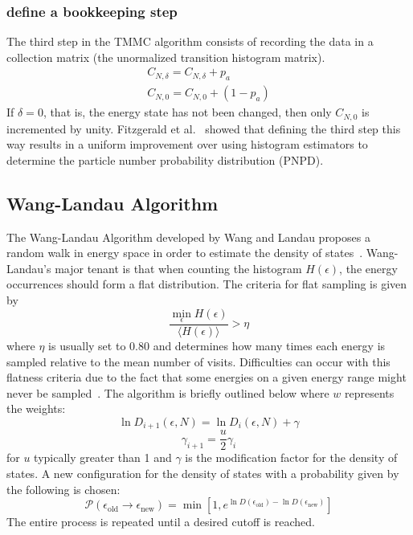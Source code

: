 \documentclass[letterpaper,twocolumn,amsmath,amssymb,pre,aps,10pt]{revtex4-1}
\begin{document}
\subsubsection{define a bookkeeping step}
The third step in the TMMC algorithm consists of recording the data in
a collection matrix (the unormalized transition histogram matrix).
\begin{align}
  C_{N,\delta} = C_{N,\delta} + p_{a}\\
  C_{N,0} = C_{N,0} +(1 - p_{a})
\end{align} If $\delta=0$, that is, the energy state has not been
changed, then only $C_{N,0}$ is incremented by unity. Fitzgerald et
al.~\cite{fitzgerald2000monte} showed that defining the third step this
way results in a uniform improvement over using histogram estimators to
determine the particle number probability distribution (PNPD).

\subsection{Wang-Landau Algorithm}

The Wang-Landau Algorithm developed by Wang and Landau proposes a
random walk in energy space in order to estimate the density of
states~\cite{wang2001efficient,wang2001determining, landau2014guide}.
Wang-Landau's major tenant is that when counting the histogram
$H(\epsilon)$, the energy occurrences should form a flat distribution.
The criteria for flat sampling is given by
\begin{equation}
	\frac{\min_{\epsilon} H(\epsilon)}
	{\big\langle H(\epsilon)\big\rangle }
	> \eta
\end{equation}
where $\eta$ is usually set to $0.80$ and determines how many times
each energy is sampled relative to the mean number of visits.
Difficulties can occur with this flatness criteria due to the fact that
some energies on a given energy range might never be
sampled~\cite{haber2014transition}. The algorithm is briefly outlined
below where $w$ represents the weights:
\begin{equation}
	\ln{D_{i+1}(\epsilon,N)}=\ln{D_{i}(\epsilon,N)}
	+\gamma
\end{equation}
\begin{equation}
	\gamma_{i+1}=\frac{u}{2} \gamma_{i}
\end{equation}
for $u$ typically greater than 1 and $\gamma$ is the modification
factor for the density of states.  A new configuration for the density
of states with a probability given by the following is chosen:
\begin{equation}
	\mathcal{P}(\epsilon_\text{old} \rightarrow \epsilon_\text{new})
	= \min[1,e^{\ln{D(\epsilon_\text{old})}-\ln{D(\epsilon_\text{new})}}]
\end{equation}
The entire process is repeated until a desired cutoff is reached.
\end{document}
